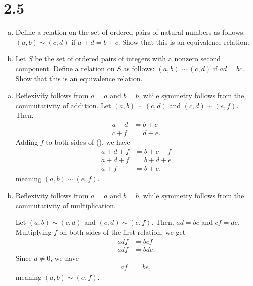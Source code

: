 \documentclass[10pt]{mypackage}
\begin{document}
\section{2.5}%
\begin{problem}\hfill
  \begin{enumerate}[(a)]
    \item Define a relation on the set of ordered pairs of natural numbers as follows: $(a,b)\sim (c,d)$ if $a + d = b +c$. Show that this is an equivalence relation.
    \item Let $S$ be the set of ordered pairs of integers with a nonzero second component. Define a relation on $S$ as follows: $(a,b)\sim (c,d)$ if $ad = bc$. Show that this is an equivalence relation.
  \end{enumerate}
\end{problem}
\begin{solution}\hfill
  \begin{enumerate}[(a)]
    \item Reflexivity follows from $a = a$ and $b = b$, while symmetry follows from the commutativity of addition. Let $(a,b)\sim (c,d)$ and $(c,d)\sim (e,f)$. Then,
      \begin{align*}
        a + d &= b + c\tag*{(\textasteriskcentered)}\\
        c + f &= d + e\tag*{(\textasteriskcentered\textasteriskcentered)}.
      \end{align*}
      Adding $f$ to both sides of (\textasteriskcentered), we have
      \begin{align*}
        a + d + f &= b + c + f\\
        a + d + f &= b + d + e\\
        a + f &= b + e,
      \end{align*}
      meaning $(a,b)\sim (e,f)$.
    \item Reflexivity follows from $a = a$ and $b = b$, while symmetry follows from the commutativity of multiplication.\newline

      Let $(a,b)\sim (c,d)$ and $(c,d)\sim (e,f)$. Then, $ad = bc$ and $cf = de$. Multiplying $f$ on both sides of the first relation, we get
      \begin{align*}
        adf &= bcf\\
        adf &= bde.
      \end{align*}
      Since $d\neq 0$, we have
      \begin{align*}
        af &= be,
      \end{align*}
      meaning $(a,b)\sim (e,f)$.
  \end{enumerate}
\end{solution}
\end{document}
